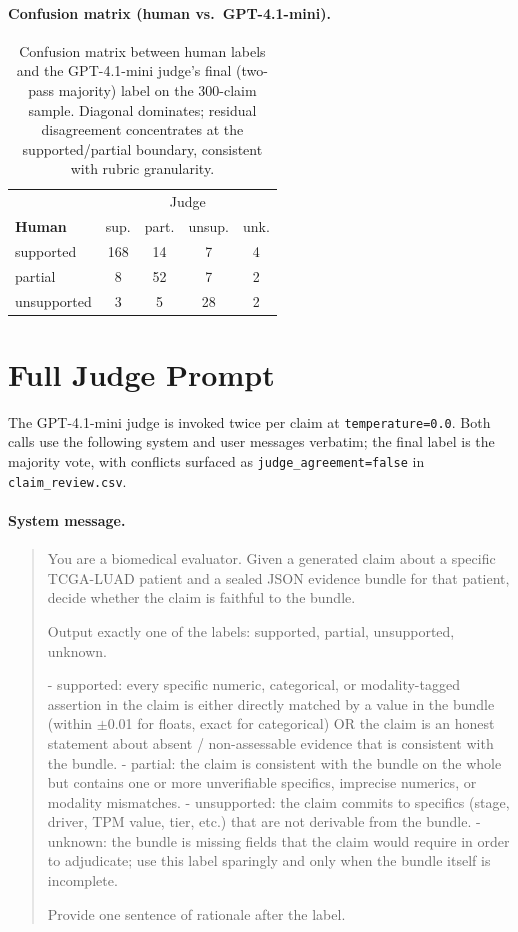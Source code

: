 \documentclass{article}
\theoremstyle{plain}
\begin{document}
\paragraph{Confusion matrix (human vs.\ GPT-4.1-mini).}

\begin{table}[h]
\centering
\small
\begin{tabular}{l|cccc}
\toprule
 & \multicolumn{4}{c}{Judge} \\
\textbf{Human} & sup. & part. & unsup. & unk. \\
\midrule
supported   & 168 & 14  & 7  & 4 \\
partial     & 8   & 52  & 7  & 2 \\
unsupported & 3   & 5   & 28 & 2 \\
\bottomrule
\end{tabular}
\caption{Confusion matrix between human labels and the GPT-4.1-mini judge's final (two-pass majority) label on the 300-claim sample. Diagonal dominates; residual disagreement concentrates at the supported/partial boundary, consistent with rubric granularity.}
\label{tab:cm}
\end{table}

\section{Full Judge Prompt}
\label{app:judgeprompt}

The GPT-4.1-mini judge is invoked twice per claim at \texttt{temperature=0.0}. Both calls use the following system and user messages verbatim; the final label is the majority vote, with conflicts surfaced as \texttt{judge\_agreement=false} in \texttt{claim\_review.csv}.

\paragraph{System message.}
\begin{quote}\small\ttfamily
You are a biomedical evaluator. Given a generated claim about a specific TCGA-LUAD patient and a sealed JSON evidence bundle for that patient, decide whether the claim is faithful to the bundle.

Output exactly one of the labels: supported, partial, unsupported, unknown.

- supported: every specific numeric, categorical, or modality-tagged assertion in the claim is either directly matched by a value in the bundle (within $\pm$0.01 for floats, exact for categorical) OR the claim is an honest statement about absent / non-assessable evidence that is consistent with the bundle.
- partial: the claim is consistent with the bundle on the whole but contains one or more unverifiable specifics, imprecise numerics, or modality mismatches.
- unsupported: the claim commits to specifics (stage, driver, TPM value, tier, etc.) that are not derivable from the bundle.
- unknown: the bundle is missing fields that the claim would require in order to adjudicate; use this label sparingly and only when the bundle itself is incomplete.

Provide one sentence of rationale after the label.
\end{quote}
\end{document}
